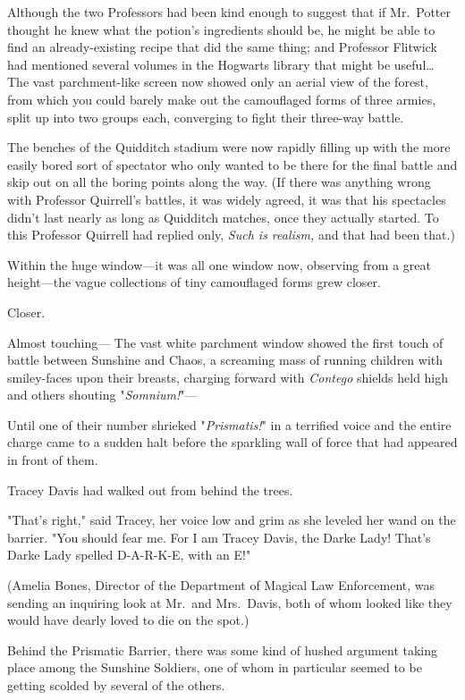 Although the two Professors had been kind enough to suggest that if Mr.~Potter
thought he knew what the potion's ingredients should be, he might be able to
find an already-existing recipe that did the same thing; and Professor Flitwick
had mentioned several volumes in the Hogwarts library that might be
useful{\ldots}
\later
The vast parchment-like screen now showed only an aerial view of the forest,
from which you could barely make out the camouflaged forms of three armies,
split up into two groups each, converging to fight their three-way battle.

The benches of the Quidditch stadium were now rapidly filling up with the more
easily bored sort of spectator who only wanted to be there for the final battle
and skip out on all the boring points along the way. (If there was anything
wrong with Professor Quirrell's battles, it was widely agreed, it was that his
spectacles didn't last nearly as long as Quidditch matches, once they actually
started. To this Professor Quirrell had replied only, \emph{Such is realism,}
and that had been that.)

Within the huge window---it was all one window now, observing from a great
height---the vague collections of tiny camouflaged forms grew closer.

Closer.

Almost touching---
\later
The vast white parchment window showed the first touch of battle between
Sunshine and Chaos, a screaming mass of running children with smiley-faces upon
their breasts, charging forward with \emph{Contego} shields held high and
others shouting "\emph{Somnium!}"---

Until one of their number shrieked "\emph{Prismatis!}" in a terrified voice and
the entire charge came to a sudden halt before the sparkling wall of force that
had appeared in front of them.

Tracey Davis had walked out from behind the trees.

"That's right," said Tracey, her voice low and grim as she leveled her wand on
the barrier. "You should fear me. For I am Tracey Davis, the Darke Lady! That's
Darke Lady spelled D-A-R-K-E, with an E!"

(Amelia Bones, Director of the Department of Magical Law Enforcement, was
sending an inquiring look at Mr.~and Mrs.~Davis, both of whom looked like they
would have dearly loved to die on the spot.)

Behind the Prismatic Barrier, there was some kind of hushed argument taking
place among the Sunshine Soldiers, one of whom in particular seemed to be
getting scolded by several of the others.

